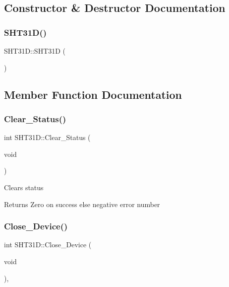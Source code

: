 \subsection{Constructor \& Destructor Documentation}
\mbox{\label{classSHT31D_a697a7f48dbe4c821e81de47d8fbb2c74}} 
\subsubsection{\texorpdfstring{S\+H\+T31\+D()}{SHT31D()}}
{\footnotesize\ttfamily S\+H\+T31\+D\+::\+S\+H\+T31D (\begin{DoxyParamCaption}{ }\end{DoxyParamCaption})\hspace{0.3cm}{\ttfamily [inline]}}



\subsection{Member Function Documentation}
\mbox{\label{classSHT31D_a29d822bbc17bae95b35270128942c2ba}} 
\subsubsection{\texorpdfstring{Clear\+\_\+\+Status()}{Clear\_Status()}}
{\footnotesize\ttfamily int S\+H\+T31\+D\+::\+Clear\+\_\+\+Status (\begin{DoxyParamCaption}\item[{void}]{ }\end{DoxyParamCaption})}

Clears status

\begin{DoxyReturn}{Returns}
Zero on success else negative error number 
\end{DoxyReturn}
\mbox{\label{classSHT31D_a925cd964b0a6535d40dff588ac7d02be}} 
\subsubsection{\texorpdfstring{Close\+\_\+\+Device()}{Close\_Device()}}
{\footnotesize\ttfamily int S\+H\+T31\+D\+::\+Close\+\_\+\+Device (\begin{DoxyParamCaption}\item[{void}]{ }\end{DoxyParamCaption})\hspace{0.3cm}{\ttfamily [override]}, {\ttfamily [virtual]}}

